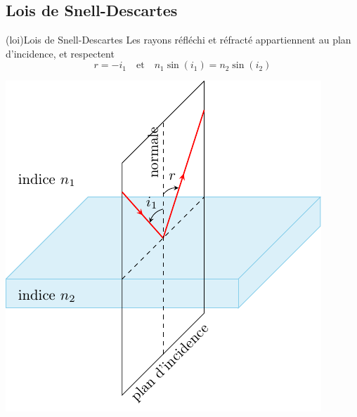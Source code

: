 \documentclass[../../main/main.tex]{subfiles}
\begin{document}
\subsection{Lois de Snell-Descartes}

\begin{tcb}[label=loi:snelldescartes](loi){Lois de Snell-Descartes}
	Les rayons réfléchi et réfracté appartiennent au plan d'incidence,
	et respectent
	\begin{equation*}
		\boxed{r = -i_1}
		\quad\text{et}\quad
		\boxed{n_1\sin(i_1) = n_2\sin(i_2)}
	\end{equation*}
	\tcblower
	\begin{minipage}{0.45\linewidth}
		\begin{center}
			\includegraphics[width=\linewidth]{snell_refl.pdf}
			\label{fig:snell_refl}
		\end{center}
	\end{minipage}
	\hfill
	\begin{minipage}{0.45\linewidth}
		\begin{center}

\end{center}
\end{minipage}
\end{tcb}
\end{document}
